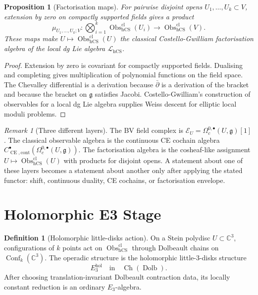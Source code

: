 \documentclass[11pt]{amsart}
\providecommand{\C}{\mathbb{C}}
\providecommand{\dbar}{\bar{\partial}}
\providecommand{\fg}{\mathfrak{g}}
\providecommand{\Obs}{\operatorname{Obs}}
\providecommand{\CE}{\operatorname{CE}}
\providecommand{\hCS}{\operatorname{hCS}}
\providecommand{\Ch}{\operatorname{Ch}}
\providecommand{\Dolb}{\operatorname{Dolb}}
\providecommand{\cE}{\mathcal{E}}
\providecommand{\cL}{\mathcal{L}}
\providecommand{\Ethree}{E_3}
\theoremstyle{plain}
\newtheorem{proposition}[theorem]{Proposition}
\theoremstyle{definition}
\newtheorem{definition}[theorem]{Definition}
\theoremstyle{remark}
\newtheorem{remark}[theorem]{Remark}
\begin{document}
\begin{proposition}[Factorisation maps]
\label{prop:factorisation-maps}
For pairwise disjoint opens \(U_1,\ldots,U_k\subset V\), extension by
zero on compactly supported fields gives a product
\[
  \mu_{U_1,\ldots,U_k;V}\colon
  \bigotimes_{i=1}^k
  \Obs^{\mathrm{cl}}_{\hCS}(U_i)
  \longrightarrow
  \Obs^{\mathrm{cl}}_{\hCS}(V).
\]
These maps make \(U\mapsto\Obs^{\mathrm{cl}}_{\hCS}(U)\) the classical
Costello-Gwilliam factorisation algebra of the local dg Lie algebra
\(\cL_{\hCS}\).
\end{proposition}

\begin{proof}
Extension by zero is covariant for compactly supported fields. Dualising
and completing gives multiplication of polynomial functions on the field
space. The Chevalley differential is a derivation because \(\dbar\) is a
derivation of the bracket and because the bracket on \(\fg\) satisfies
Jacobi. Costello-Gwilliam's construction of observables for a local dg
Lie algebra supplies Weiss descent for elliptic local moduli problems.
\end{proof}

\begin{remark}[Three different layers]
\label{rem:three-layers}
The BV field complex is \(\cE_U=\Omega_c^{0,\bullet}(U,\fg)[1]\). The
classical observable algebra is the continuous CE cochain algebra
\(C^\bullet_{\CE,\mathrm{cont}}(\Omega_c^{0,\bullet}(U,\fg))\). The
factorisation algebra is the cosheaf-like assignment \(U\mapsto
\Obs^{\mathrm{cl}}_{\hCS}(U)\) with products for disjoint opens. A
statement about one of these layers becomes a statement about another
only after applying the stated functor: shift, continuous duality, CE
cochains, or factorisation envelope.
\end{remark}

\section{Holomorphic E3 Stage}
\label{sec:holomorphic-e3-stage}

\begin{definition}[Holomorphic little-disks action]
\label{def:hol-e3}
On a Stein polydisc \(U\subset\C^3\), configurations of \(k\) points act
on \(\Obs^{\mathrm{cl}}_{\hCS}\) through Dolbeault chains on
\(\operatorname{Conf}_k(\C^3)\). The operadic structure is the
holomorphic little-\(3\)-disks structure
\[
  \Ethree^{\mathrm{hol}}\quad\text{in}\quad \Ch(\Dolb).
\]
After choosing translation-invariant Dolbeault contraction data, its
locally constant reduction is an ordinary \(\Ethree\)-algebra.
\end{definition}
\end{document}
